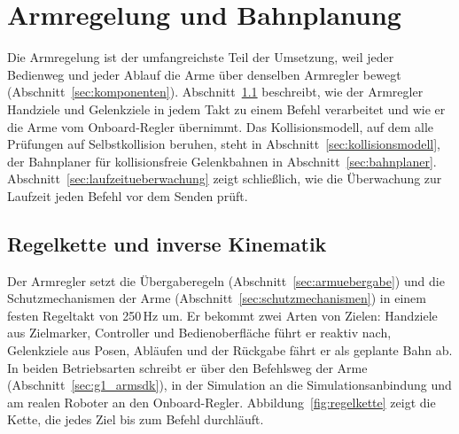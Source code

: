 


\section{Armregelung und Bahnplanung}
\label{sec:armregelung}
Die Armregelung ist der umfangreichste Teil der Umsetzung, weil jeder Bedienweg und jeder Ablauf die Arme über denselben Armregler bewegt (Abschnitt~\ref{sec:komponenten}).
Abschnitt~\ref{sec:regelkette} beschreibt, wie der Armregler Handziele und Gelenkziele in jedem Takt zu einem Befehl verarbeitet und wie er die Arme vom Onboard-Regler übernimmt.
Das Kollisionsmodell, auf dem alle Prüfungen auf Selbstkollision beruhen, steht in Abschnitt~\ref{sec:kollisionsmodell}, der Bahnplaner für kollisionsfreie Gelenkbahnen in Abschnitt~\ref{sec:bahnplaner}.
Abschnitt~\ref{sec:laufzeitueberwachung} zeigt schließlich, wie die Überwachung zur Laufzeit jeden Befehl vor dem Senden prüft.

\subsection{Regelkette und inverse Kinematik}
\label{sec:regelkette}
Der Armregler setzt die Übergaberegeln (Abschnitt~\ref{sec:armuebergabe}) und die Schutzmechanismen der Arme (Abschnitt~\ref{sec:schutzmechanismen}) in einem festen Regeltakt von 250\,Hz um.
Er bekommt zwei Arten von Zielen: Handziele aus Zielmarker, Controller und Bedienoberfläche führt er reaktiv nach, Gelenkziele aus Posen, Abläufen und der Rückgabe fährt er als geplante Bahn ab.
In beiden Betriebsarten schreibt er über den Befehlsweg der Arme (Abschnitt~\ref{sec:g1_armsdk}), in der Simulation an die Simulationsanbindung und am realen Roboter an den Onboard-Regler.
Abbildung~\ref{fig:regelkette} zeigt die Kette, die jedes Ziel bis zum Befehl durchläuft.

